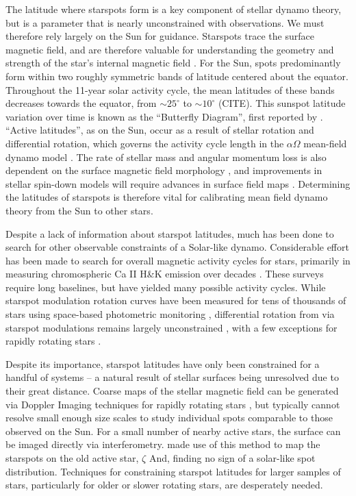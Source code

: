 \documentclass[preprint2]{aastex61}
\begin{document}
The latitude where starspots form is a key component of stellar dynamo theory, but is a parameter that is nearly unconstrained with observations. We must therefore rely largely on the Sun for guidance. Starspots trace the surface magnetic field, and are therefore valuable for understanding the geometry and strength of the star's internal magnetic field \citep{berdyugina2005}.
For the Sun, spots predominantly form within two roughly symmetric bands of latitude centered about the equator. Throughout the 11-year solar activity cycle, the mean latitudes of these bands decreases towards the equator, from $\sim$$25^\circ$ to $\sim$$10^\circ$ (CITE). This sunspot latitude variation over time is known as the ``Butterfly Diagram'', first reported by \citet{maunder1904}.
``Active latitudes'', as on the Sun, occur as a result of stellar rotation and differential rotation, which governs the activity cycle length in the $\alpha\Omega$ mean-field dynamo model \citep{brandenburg2005}. The rate of stellar mass and angular momentum loss is also dependent on the surface magnetic field morphology \citep{garraffo2015}, and improvements in stellar spin-down models will require advances in surface field maps \citep{garraffo2016}.
Determining the latitudes of starspots is therefore vital for calibrating mean field dynamo theory from the Sun to other stars.


Despite a lack of information about starspot latitudes, much has been done to search for other observable constraints of a Solar-like dynamo.
Considerable effort has been made to search for overall magnetic activity cycles for stars, primarily in measuring chromospheric Ca II H\&K emission over decades \citep[e.g.]{wilson1978,baliunas1995}. These surveys require long baselines, but have yielded many possible activity cycles. While starspot modulation rotation curves have been measured for tens of thousands of stars using space-based photometric monitoring \citep{mcquillan2014}, differential rotation from via starspot modulations remains largely unconstrained \citep{aigrain2015}, with a few exceptions for rapidly rotating stars \citep[e.g.][]{davenport2015b}. 


Despite its importance, starspot latitudes have only been constrained for a handful of systems -- a natural result of stellar surfaces being unresolved due to their great distance. 
Coarse maps of the stellar magnetic field can be generated via Doppler Imaging techniques for rapidly rotating stars \citep{semel1989,donati_brown1997}, but typically cannot resolve small enough size scales to study individual spots comparable to those observed on the Sun.
For a small number of nearby active stars, the surface can be imaged directly via interferometry. \cite{roettenbacher2016} made use of this method to map the starspots on the old active star, $\zeta$ And, finding no sign of a solar-like spot distribution. Techniques for constraining starspot latitudes for larger samples of stars, particularly for older or slower rotating stars, are desperately needed.
\end{document}
